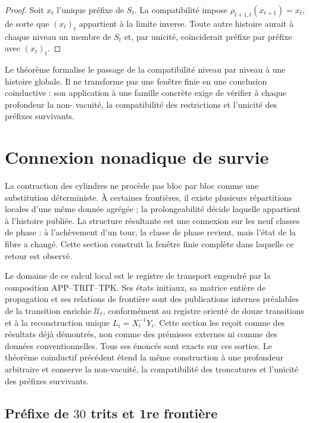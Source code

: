 \begin{proof}
Soit \(x_t\) l'unique préfixe de \(S_t\). La compatibilité impose
\(\rho_{t+1,t}(x_{t+1})=x_t\), de sorte que \((x_t)_t\) appartient à la limite
inverse. Toute autre histoire aurait à chaque niveau un membre de \(S_t\)
et, par unicité, coïnciderait préfixe par préfixe avec \((x_t)_t\).
\end{proof}

Le théorème formalise le passage de la compatibilité niveau par niveau à une histoire
globale. Il ne transforme pas une fenêtre finie en une conclusion coinductive : son
application à une famille concrète exige de vérifier à chaque profondeur la non-
vacuité, la compatibilité des restrictions et l'unicité des préfixes
survivants.

\section{Connexion nonadique de survie}
\label{sec:conexion-nonadica}

La contraction des cylindres ne procède pas bloc par bloc comme une substitution
déterministe. À certaines frontières, il existe plusieurs répartitions locales d'une
même donnée agrégée ; la prolongeabilité décide laquelle appartient à l'histoire
publiée. La structure résultante est une connexion sur les neuf classes de
phase : à l'achèvement d'un tour, la classe de phase revient, mais l'état de la
fibre a changé. Cette section construit la fenêtre finie complète dans laquelle
ce retour est observé.

Le domaine de ce calcul local est le registre de transport engendré par la
composition APP--TRIT--TPK. Ses états initiaux, sa matrice entière de
propagation et ses relations de frontière sont des publications internes préalables de
la transition enrichie \(\mathcal U_t\), conformément au registre orienté de
douze transitions et à la reconstruction unique
\(L_i=X_i^{-1}Y_i\). Cette section les reçoit comme des résultats déjà démontrés,
non comme des prémisses externes ni comme des données conventionnelles. Tous ses énoncés
sont exacts sur ces sorties. Le théorème coinductif précédent étend la
même construction à une profondeur arbitraire et conserve la non-vacuité,
la compatibilité des troncatures et l'unicité des préfixes survivants.

\subsection{Préfixe de \(30\) trits et 1re frontière}

